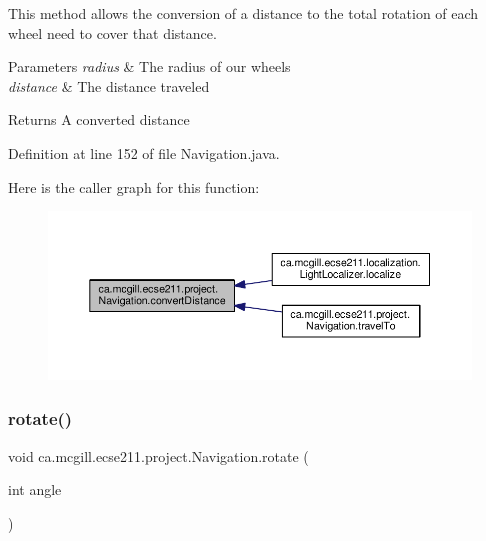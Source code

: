 This method allows the conversion of a distance to the total rotation of each wheel need to cover that distance.


\begin{DoxyParams}{Parameters}
{\em radius} & The radius of our wheels \\
\hline
{\em distance} & The distance traveled \\
\hline
\end{DoxyParams}
\begin{DoxyReturn}{Returns}
A converted distance 
\end{DoxyReturn}


Definition at line 152 of file Navigation.\+java.

Here is the caller graph for this function\+:
\nopagebreak
\begin{figure}[H]
\begin{center}
\leavevmode
\includegraphics[width=350pt]{classca_1_1mcgill_1_1ecse211_1_1project_1_1_navigation_ac9e260bcd619ffa4820d7d0de7ea1c12_icgraph}
\end{center}
\end{figure}
\mbox{\label{classca_1_1mcgill_1_1ecse211_1_1project_1_1_navigation_af2bddd9a34ea26cfd9a1e4ac055644dc}} 
\subsubsection{\texorpdfstring{rotate()}{rotate()}}
{\footnotesize\ttfamily void ca.\+mcgill.\+ecse211.\+project.\+Navigation.\+rotate (\begin{DoxyParamCaption}\item[{int}]{angle }\end{DoxyParamCaption})}

